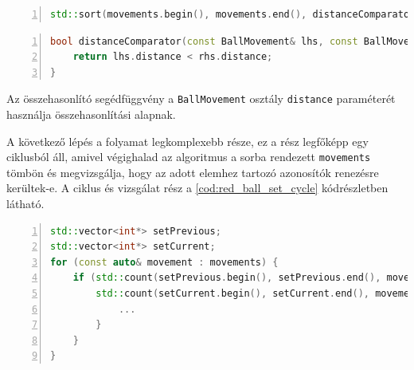 \vspace{2mm}
\hspace{-10mm}
\begin{minipage}{\linewidth}
\begin{lstlisting}[language=C++, numbers=left, caption={Piros golyók közti távolságok sorba rendezése.}, label={cod:red_ball_sort}]
std::sort(movements.begin(), movements.end(), distanceComparator);
\end{lstlisting}
\end{minipage}

\vspace{2mm}
\hspace{-10mm}
\begin{minipage}{\linewidth}
\begin{lstlisting}[language=C++, numbers=left, caption={A \ref{cod:red_ball_sort} kódrészletben használt összehasonlító segédfüggvény.}, label={cod:red_ball_sort_helper}]
bool distanceComparator(const BallMovement& lhs, const BallMovement& rhs) {
    return lhs.distance < rhs.distance;
}
\end{lstlisting}
\end{minipage}

\par Az összehasonlító segédfüggvény a \lstinline{BallMovement} osztály \lstinline{distance} paraméterét használja összehasonlítási alapnak.
\par A következő lépés a folyamat legkomplexebb része, ez a rész legfőképp egy ciklusból áll, amivel végighalad az algoritmus a sorba rendezett \lstinline{movements} tömbön és megvizsgálja, hogy az adott elemhez tartozó azonosítók renezésre kerültek-e. A ciklus és vizsgálat rész a \ref{cod:red_ball_set_cycle} kódrészletben látható.

\vspace{2mm}
\hspace{-10mm}
\begin{minipage}{\linewidth}
\begin{lstlisting}[language=C++, numbers=left, caption={A \ref{cod:red_ball_sort} kódrészletben használt összehasonlító segédfüggvény.}, label={cod:red_ball_set_cycle}]
std::vector<int*> setPrevious;
std::vector<int*> setCurrent;
for (const auto& movement : movements) {
    if (std::count(setPrevious.begin(), setPrevious.end(), movement.previousId) <= 0 &&
        std::count(setCurrent.begin(), setCurrent.end(), movement.currentId) <= 0) {
            ...
        }
    }
}
\end{lstlisting}
\end{minipage}


